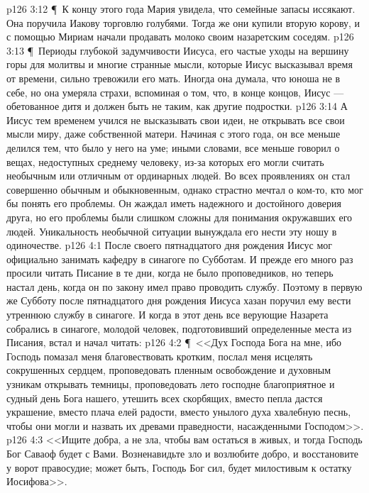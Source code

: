 \vs p126 3:12 \P\ К концу этого года Мария увидела, что семейные запасы иссякают. Она поручила Иакову торговлю голубями. Тогда же они купили вторую корову, и с помощью Мириам начали продавать молоко своим назаретским соседям.
\vs p126 3:13 \P\ Периоды глубокой задумчивости Иисуса, его частые уходы на вершину горы для молитвы и многие странные мысли, которые Иисус высказывал время от времени, сильно тревожили его мать. Иногда она думала, что юноша не в себе, но она умеряла страхи, вспоминая о том, что, в конце концов, Иисус --- обетованное дитя и должен быть не таким, как другие подростки.
\vs p126 3:14 А Иисус тем временем учился не высказывать свои идеи, не открывать все свои мысли миру, даже собственной матери. Начиная с этого года, он все меньше делился тем, что было у него на уме; иными словами, все меньше говорил о вещах, недоступных среднему человеку, из\hyp{}за которых его могли считать необычным или отличным от ординарных людей. Во всех проявлениях он стал совершенно обычным и обыкновенным, однако страстно мечтал о ком\hyp{}то, кто мог бы понять его проблемы. Он жаждал иметь надежного и достойного доверия друга, но его проблемы были слишком сложны для понимания окружавших его людей. Уникальность необычной ситуации вынуждала его нести эту ношу в одиночестве.
\vs p126 4:1 После своего пятнадцатого дня рождения Иисус мог официально занимать кафедру в синагоге по Субботам. И прежде его много раз просили читать Писание в те дни, когда не было проповедников, но теперь настал день, когда он по закону имел право проводить службу. Поэтому в первую же Субботу после пятнадцатого дня рождения Иисуса хазан поручил ему вести утреннюю службу в синагоге. И когда в этот день все верующие Назарета собрались в синагоге, молодой человек, подготовивший определенные места из Писания, встал и начал читать:
\vs p126 4:2 \P\ <<Дух Господа Бога на мне, ибо Господь помазал меня благовествовать кротким, послал меня исцелять сокрушенных сердцем, проповедовать пленным освобождение и духовным узникам открывать темницы, проповедовать лето господне благоприятное и судный день Бога нашего, утешить всех скорбящих, вместо пепла дастся украшение, вместо плача елей радости, вместо унылого духа хвалебную песнь, чтобы они могли и назвать их древами праведности, насажденными Господом>>.
\vs p126 4:3 <<Ищите добра, а не зла, чтобы вам остаться в живых, и тогда Господь Бог Саваоф будет с Вами. Возненавидьте зло и возлюбите добро, и восстановите у ворот правосудие; может быть, Господь Бог сил, будет милостивым к остатку Иосифова>>.
